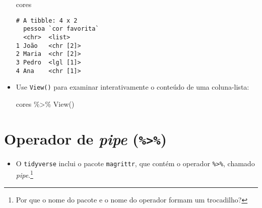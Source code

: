 \documentclass[
  letterpaper,
  DIV=11,
  numbers=noendperiod]{scrreprt}
\newenvironment{Shaded}{\begin{snugshade}}{\end{snugshade}}
\newcommand{\FunctionTok}[1]{\textcolor[rgb]{0.28,0.35,0.67}{#1}}
\newcommand{\NormalTok}[1]{\textcolor[rgb]{0.00,0.23,0.31}{#1}}
\newcommand{\SpecialCharTok}[1]{\textcolor[rgb]{0.37,0.37,0.37}{#1}}
\providecommand{\tightlist}{%
  \setlength{\itemsep}{0pt}\setlength{\parskip}{0pt}}\usepackage{longtable,booktabs,array}
\begin{document}
\begin{itemize}
\begin{Shaded}
\begin{Highlighting}[]
\NormalTok{cores}
\end{Highlighting}
\end{Shaded}

\begin{verbatim}
# A tibble: 4 x 2
  pessoa `cor favorita`
  <chr>  <list>        
1 João   <chr [2]>     
2 Maria  <chr [2]>     
3 Pedro  <lgl [1]>     
4 Ana    <chr [1]>     
\end{verbatim}
\item
  Use \texttt{View()} para examinar interativamente o conteúdo de uma
  coluna-lista:

\begin{Shaded}
\begin{Highlighting}[]
\NormalTok{cores }\SpecialCharTok{\%\textgreater{}\%} \FunctionTok{View}\NormalTok{()}
\end{Highlighting}
\end{Shaded}
\end{itemize}

\section{\texorpdfstring{Operador de \emph{pipe}
(\texttt{\%\textgreater{}\%})}{Operador de pipe (\%\textgreater\%)}}\label{operador-de-pipe}

\begin{itemize}
\tightlist
\item
  O \texttt{tidyverse} inclui o pacote \texttt{magrittr}, que contém o
  operador \texttt{\%\textgreater{}\%}, chamado \emph{pipe}.\footnote{Por
    que o nome do pacote e o nome do operador formam um trocadilho?}
\end{itemize}
\end{document}
